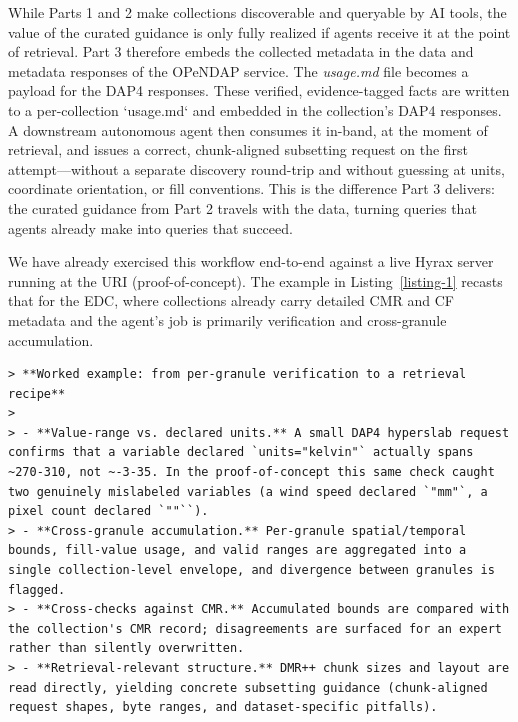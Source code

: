 \documentclass[11pt]{article}
\begin{document}
While Parts 1 and 2 make collections discoverable and queryable by \ac{AI} tools, the value of the curated guidance is only fully realized if agents receive it at the point of retrieval. Part 3 therefore embeds the collected metadata in the data and metadata responses of the \ac{OPeNDAP} service. The {\em usage.md} file becomes a payload for the \ac{DAP4} responses. These verified, evidence-tagged facts are written to a per-collection `usage.md` and embedded in the collection's \ac{DAP4} responses. A downstream autonomous agent then consumes it in-band, at the moment of retrieval, and issues a correct, chunk-aligned subsetting request on the first attempt—without a separate discovery round-trip and without guessing at units, coordinate orientation, or fill conventions. This is the difference Part 3 delivers: the curated guidance from Part 2 travels with the data, turning queries that agents already make into queries that succeed.

We have already exercised this workflow end-to-end against a live Hyrax server running at the \ac{URI} (proof-of-concept). The example in Listing~\ref{listing-1} recasts that for the \ac{EDC}, where collections already carry detailed \ac{CMR} and \ac{CF} metadata and the agent's job is primarily verification and cross-granule accumulation.

\begin{lstlisting}[caption={Proof-of-concept example run against Hyrax at the University of Rhode Island and recast for the NASA EDC}, label={listing-1}]
> **Worked example: from per-granule verification to a retrieval recipe**
>
> - **Value-range vs. declared units.** A small DAP4 hyperslab request confirms that a variable declared `units="kelvin"` actually spans ~270-310, not ~-3-35. In the proof-of-concept this same check caught two genuinely mislabeled variables (a wind speed declared `"mm"`, a pixel count declared `""``).
> - **Cross-granule accumulation.** Per-granule spatial/temporal bounds, fill-value usage, and valid ranges are aggregated into a single collection-level envelope, and divergence between granules is flagged.
> - **Cross-checks against CMR.** Accumulated bounds are compared with the collection's CMR record; disagreements are surfaced for an expert rather than silently overwritten.
> - **Retrieval-relevant structure.** DMR++ chunk sizes and layout are read directly, yielding concrete subsetting guidance (chunk-aligned request shapes, byte ranges, and dataset-specific pitfalls).
\end{lstlisting}
\end{document}
